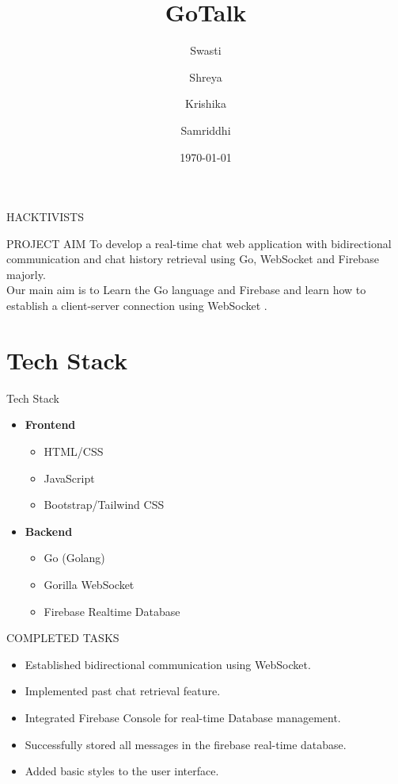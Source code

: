 \documentclass{beamer}
\title{GoTalk}
\author{Swasti \and Shreya \and Krishika \and Samriddhi}
\date{\today}
\begin{document}
\begin{frame}
    \titlepage
    \centering HACKTIVISTS
\end{frame}

\begin{frame}{PROJECT AIM}
    To develop a real-time chat web application with bidirectional communication and chat history retrieval using Go, WebSocket and Firebase majorly.   
    \\
    Our main aim is to Learn the Go language and Firebase and learn how to establish a client-server connection using WebSocket .
\end{frame}

\section{Tech Stack}
\begin{frame}{Tech Stack}
    \begin{itemize}
        \item \textbf{Frontend}
        \begin{itemize}
            \item HTML/CSS
            \item JavaScript
            \item Bootstrap/Tailwind CSS
        \end{itemize}
        \item \textbf{Backend}
        \begin{itemize}
            \item Go (Golang)
            \item Gorilla WebSocket
            \item Firebase Realtime Database
        \end{itemize}
    \end{itemize}
\end{frame}

\begin{frame}{COMPLETED TASKS}
    \begin{itemize}
        \item Established bidirectional communication using WebSocket.
        \item Implemented past chat retrieval feature.
        \item Integrated Firebase Console for real-time Database management.
        \item Successfully stored all messages in the firebase real-time database.
        \item Added basic styles to the user interface. 
   \end{itemize}
\end{frame}
\end{document}
